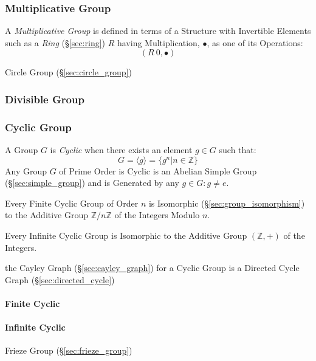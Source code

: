 \subsubsection{Multiplicative Group}\label{sec:multiplicative_group}

A \emph{Multiplicative Group} is defined in terms of a Structure with
Invertible Elements such as a \emph{Ring} (\S\ref{sec:ring}) $R$
having Multiplication, $\bullet$, as one of its Operations:
\[
  (R \ {0}, \bullet)
\]

Circle Group (\S\ref{sec:circle_group})



\subsubsection{Divisible Group}\label{sec:divisible_group}

\subsubsection{Cyclic Group}\label{sec:cyclic_group}

A Group $G$ is \emph{Cyclic} when there exists an element $g \in G$
such that:
\[
    G = \langle g \rangle = \{ g^n | n \in \mathbb{Z} \}
\]
Any Group $G$ of Prime Order is Cyclic is an Abelian Simple Group
(\S\ref{sec:simple_group}) and is Generated by any $g \in G : g \neq
e$.

Every Finite Cyclic Group of Order $n$ is Isomorphic
(\S\ref{sec:group_isomorphism}) to the Additive Group
$\mathbb{Z}/n\mathbb{Z}$ of the Integers Modulo $n$.

Every Infinite Cyclic Group is Isomorphic to the Additive Group
$(\mathbb{Z}, +)$ of the Integers.

the Cayley Graph (\S\ref{sec:cayley_graph}) for a Cyclic Group is a
Directed Cycle Graph (\S\ref{sec:directed_cycle})



\paragraph{Finite Cyclic}\label{sec:finite_cyclic}\hfill

\paragraph{Infinite Cyclic}\label{sec:infinite_cyclic}\hfill

Frieze Group (\S\ref{sec:frieze_group})



